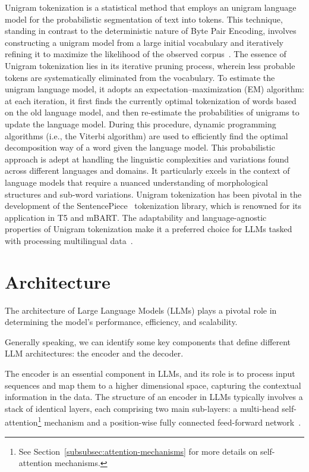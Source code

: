 Unigram tokenization is a statistical method that employs an unigram language model for the probabilistic segmentation of text into tokens.
This technique, standing in contrast to the deterministic nature of Byte Pair Encoding, involves constructing a unigram model from a large initial vocabulary and iteratively refining it to maximize the likelihood of the observed corpus~\cite{kudo2018sentencepiece}.
The essence of Unigram tokenization lies in its iterative pruning process, wherein less probable tokens are systematically eliminated from the vocabulary.
To estimate the unigram language model, it adopts an expectation–maximization (EM) algorithm: at each iteration, it first finds the currently optimal tokenization of words based on the old language model, and then re-estimate the probabilities of unigrams to update the language model.
During this procedure, dynamic programming algorithms (i.e., the Viterbi algorithm) are used to efficiently find the optimal decomposition way of a word given the language model\cite{survey}.
This probabilistic approach is adept at handling the linguistic complexities and variations found across different languages and domains.
It particularly excels in the context of language models that require a nuanced understanding of morphological structures and sub-word variations.
Unigram tokenization has been pivotal in the development of the SentencePiece~\cite{kudo2018sentencepiece} tokenization library, which is renowned for its application in T5 and mBART\@.
The adaptability and language-agnostic properties of Unigram tokenization make it a preferred choice for LLMs tasked with processing multilingual data~\cite{kudo2018sentencepiece}.

\section{Architecture}
\label{sec:architecture}

The architecture of Large Language Models (LLMs) plays a pivotal role in determining the model's performance, efficiency, and scalability.

Generally speaking, we can identify some key components that define different LLM architectures: the encoder and the decoder.

The encoder is an essential component in LLMs, and its role is to process input sequences and map them to a higher dimensional space, capturing the contextual information in the data.
The structure of an encoder in LLMs typically involves a stack of identical layers, each comprising two main sub-layers: a multi-head self-attention\footnote{See Section~\ref{subsubsec:attention-mechanisms} for more details on self-attention mechanisms.} mechanism and a position-wise fully connected feed-forward network~\cite{vaswani2023attention}.

